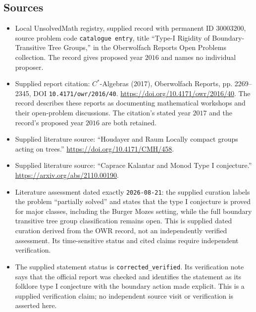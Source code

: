 \documentclass[11pt]{article}
\begin{document}
\subsection{Sources}
\begin{itemize}
\item Local UnsolvedMath registry, supplied record with permanent ID \(30003200\), source problem code \texttt{catalogue entry}, title ``Type-I Rigidity of Boundary-Transitive Tree Groups,'' in the Oberwolfach Reports Open Problems collection. The record gives proposed year \(2016\) and names no individual proposer.
\item Supplied report citation: \(C^*\)-Algebras (2017), Oberwolfach Reports, pp. 2269--2345, DOI \texttt{10.4171/owr/2016/40}. \url{https://doi.org/10.4171/owr/2016/40}. The record describes these reports as documenting mathematical workshops and their open-problem discussions. The citation's stated year \(2017\) and the record's proposed year \(2016\) are both retained.
\item Supplied literature source: ``Houdayer and Raum Locally compact groups acting on trees.'' \url{https://doi.org/10.4171/CMH/458}.
\item Supplied literature source: ``Caprace Kalantar and Monod Type I conjecture.'' \url{https://arxiv.org/abs/2110.00190}.
\item Literature assessment dated exactly \texttt{2026-08-21}: the supplied curation labels the problem ``partially solved'' and states that the type I conjecture is proved for major classes, including the Burger Mozes setting, while the full boundary transitive tree group classification remains open. This is supplied dated curation derived from the OWR record, not an independently verified assessment. Its time-sensitive status and cited claims require independent verification.
\item The supplied statement status is \texttt{corrected\_verified}. Its verification note says that the official report was checked and identifies the statement as its folklore type I conjecture with the boundary action made explicit. This is a supplied verification claim; no independent source visit or verification is asserted here.
\end{itemize}
\end{document}
